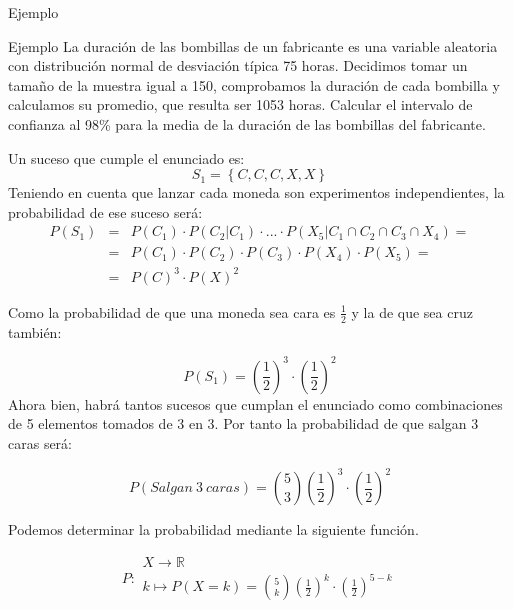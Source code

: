 \documentclass[11pt,handout]{beamer}
\begin{document}
\begin{frame}
{Ejemplo}
\begin{block}{Ejemplo} La duración de las bombillas de un fabricante es una variable aleatoria con distribución
normal de desviación típica 75 horas. Decidimos tomar un tamaño de la muestra igual a 150, comprobamos la duración de cada
bombilla y calculamos su promedio, que resulta ser 1053 horas. Calcular el intervalo de confianza al 98\%
para la media de la duración de las bombillas del fabricante.
\end{block}
Un suceso que cumple el enunciado es:
$$S_1=\left\lbrace C,C,C,X,X \right\rbrace$$
Teniendo en cuenta que lanzar cada moneda son experimentos independientes, la probabilidad de ese suceso será:
\begin{eqnarray*}
P\left(S_1\right) & = &P\left(C_1\right)\cdot P\left(C_2 | C_1 \right)\cdot ... \cdot P\left(X_5 | C_1 \cap C_2  \cap C_3  \cap X_4   \right)= \\ &  = & P\left(C_1\right)\cdot  P\left(C_2\right) \cdot P\left(C_3\right) \cdot P\left(X_4\right) \cdot P\left(X_5\right)= \\
& = & P\left(C\right)^3\cdot  P\left(X\right)^2
\end{eqnarray*}


\end{frame}

\begin{frame}{}
Como la probabilidad de que una moneda sea cara es $\frac{1}{2}$ y la de que sea cruz también:

$$P\left(S_1\right)=\left(\frac{1}{2}\right)^3\cdot  \left(\frac{1}{2}\right)^2$$
Ahora bien, habrá tantos sucesos que cumplan el enunciado como combinaciones de 5 elementos tomados de 3 en 3. Por tanto la probabilidad de que salgan 3 caras será:

$$P\left(Salgan \ 3 \ caras\right)=\binom{5}{3}\left(\frac{1}{2}\right)^3\cdot  \left(\frac{1}{2}\right)^2$$

\end{frame}

\begin{frame}{}

Podemos determinar la probabilidad mediante la siguiente función.

$$P\colon \begin{array}{l} 
          X \rightarrow \mathbb{R} \\ 
          k\mapsto P(X=k)=\binom{5}{k}\left(\frac{1}{2}\right)^k\cdot  \left(\frac{1}{2}\right)^{5-k} 
         \end{array}$$

\end{frame}
\end{document}

